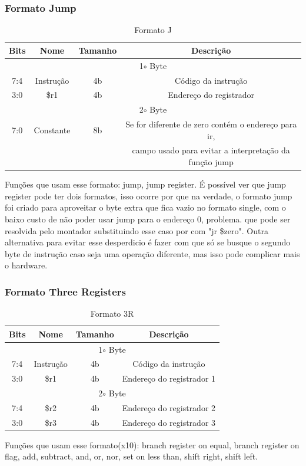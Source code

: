 \documentclass[a4paper, 10pt]{article}
\begin{document}
\subsubsection{Formato Jump}
\begin{table}[h!]
	\centering
	\caption{Formato J}
	\label{tab:formatoJump}
	\begin{tabular}{c c c c}
		\hline
		Bits & Nome & Tamanho & Descrição \\
		\hline
		\multicolumn{4}{c}{1$\circ$  Byte}       \\
		\hline
		7:4&Instrução&4b & Código da instrução\\
		3:0& \$r1 &4b & Endereço do registrador\\
		\hline
		\multicolumn{4}{c}{2$\circ$  Byte}       \\
		\hline
		7:0&Constante&8b & Se for diferente de zero contém o endereço para ir,\\ 
		&&&campo usado para evitar a interpretação da função jump\\
		\hline
	\end{tabular}
\end{table}
Funções que usam esse formato: jump, jump register. 
É possível ver que jump register pode ter dois formatos, isso ocorre por que na verdade, o formato jump foi criado para aproveitar o byte extra que fica vazio no formato single, com o baixo custo de não poder usar jump para o endereço 0, problema. que pode ser resolvida pelo montador substituindo esse caso por com "jr \$zero". Outra alternativa para evitar esse desperdicio é fazer com que só se busque o segundo byte de instrução caso seja uma operação diferente, mas isso pode complicar mais o hardware.
\subsubsection{Formato Three Registers}
\begin{table}[H]
	\centering
	\caption{Formato 3R}
	\label{tab:formato3R}
	\begin{tabular}{c c c c}
		\hline
		Bits & Nome & Tamanho & Descrição \\
		\hline
		\multicolumn{4}{c}{1$\circ$  Byte}       \\
		\hline
		7:4&Instrução&4b & Código da instrução\\
		3:0& \$r1&4b & Endereço do registrador 1\\
		\hline
		\multicolumn{4}{c}{2$\circ$  Byte}       \\
		\hline
		7:4& \$r2&4b & Endereço do registrador 2\\
		3:0& \$r3&4b & Endereço do registrador 3\\
		\hline
	\end{tabular}
\end{table}
Funções que usam esse formato(x10): branch register on equal, branch register on flag, add, subtract, and, or, nor, set on less than, shift right, shift left.
\end{document}
